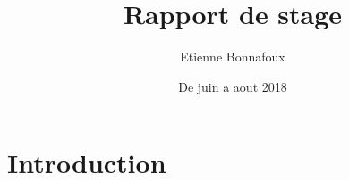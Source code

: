 \documentclass[12pt]{article}
\theoremstyle{plain}%
\theoremstyle{definition}
\theoremstyle{remark}
\begin{document}
\title{Rapport de stage}
\author{Etienne Bonnafoux}
\date{De juin a aout 2018}

\maketitle
\newpage

\tableofcontents
\newpage

\section{Introduction}

\newpage



\end{document}
